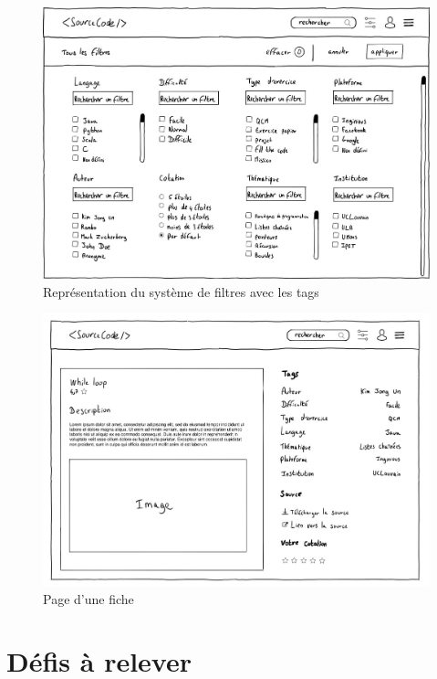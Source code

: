 \begin{figure}[H]
    \includegraphics[width=\textwidth,height=0.45\textheight,keepaspectratio]{images/filters.JPG}
    \centering
    \caption{Représentation du système de filtres avec les \glspl{tag}}
\end{figure}
\label{figure:systemeDeFiltres}


\begin{figure}[H]
    \includegraphics[width=\textwidth,height=0.45\textheight,keepaspectratio]{images/resource.JPG}
    \centering
    \caption{Page d'une \gls{fiche}}
\end{figure}

\pagebreak
\section{Défis à relever}
\label{section:challengesToDefeat}

